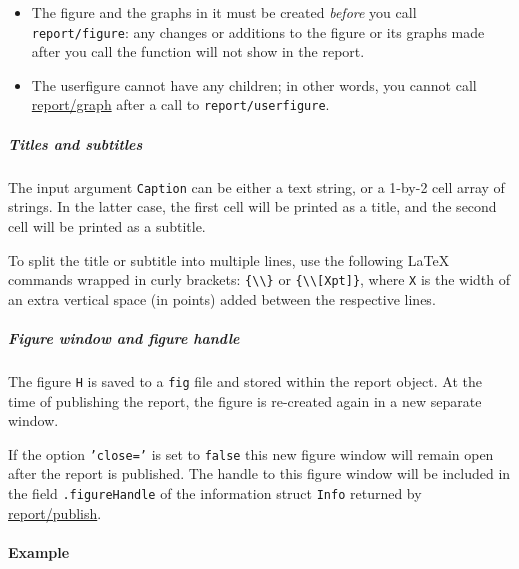  \begin{itemize}
 \item
   The figure and the graphs in it must be created \emph{before} you call
   \texttt{report/figure}: any changes or additions to the figure or its
   graphs made after you call the function will not show in the report.
 \item
   The userfigure cannot have any children; in other words, you cannot
   call \url{report/graph} after a call to \texttt{report/userfigure}.
 \end{itemize}
 
 \subparagraph{Titles and subtitles}
 
 The input argument \texttt{Caption} can be either a text string, or a
 1-by-2 cell array of strings. In the latter case, the first cell will be
 printed as a title, and the second cell will be printed as a subtitle.
 
 To split the title or subtitle into multiple lines, use the following
 LaTeX commands wrapped in curly brackets:
 \texttt{\{\textbackslash{}\textbackslash{}\}} or
 \texttt{\{\textbackslash{}\textbackslash{}{[}Xpt{]}\}}, where \texttt{X}
 is the width of an extra vertical space (in points) added between the
 respective lines.
 
 \subparagraph{Figure window and figure handle}
 
 The figure \texttt{H} is saved to a \texttt{fig} file and stored within
 the report object. At the time of publishing the report, the figure is
 re-created again in a new separate window.
 
 If the option \texttt{'close='} is set to \texttt{false} this new figure
 window will remain open after the report is published. The handle to
 this figure window will be included in the field \texttt{.figureHandle}
 of the information struct \texttt{Info} returned by
 \url{report/publish}.
 
 \paragraph{Example}


